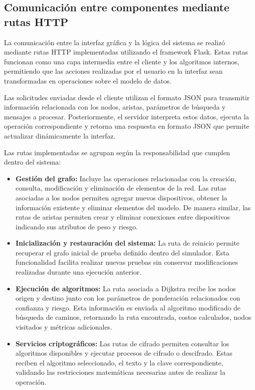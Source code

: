 \documentclass[conference]{IEEEtran}
\begin{document}
\subsection{Comunicación entre componentes mediante rutas HTTP}
La comunicación entre la interfaz gráfica y la lógica del sistema se realizó mediante rutas HTTP implementadas utilizando el framework Flask. Estas rutas funcionan como una capa intermedia entre el cliente y los algoritmos internos, permitiendo que las acciones realizadas por el usuario en la interfaz sean transformadas en operaciones sobre el modelo de datos.

Las solicitudes enviadas desde el cliente utilizan el formato JSON para transmitir información relacionada con los nodos, aristas, parámetros de búsqueda y mensajes a procesar. Posteriormente, el servidor interpreta estos datos, ejecuta la operación correspondiente y retorna una respuesta en formato JSON que permite actualizar dinámicamente la interfaz.

Las rutas implementadas se agrupan según la responsabilidad que cumplen dentro del sistema:

\begin{itemize}

    \item \textbf{Gestión del grafo:}
    Incluye las operaciones relacionadas con la creación, consulta, modificación y eliminación de elementos de la red. Las rutas asociadas a los nodos permiten agregar nuevos dispositivos, obtener la información existente y eliminar elementos del modelo. De manera similar, las rutas de aristas permiten crear y eliminar conexiones entre dispositivos indicando sus atributos de peso y riesgo.

    \item \textbf{Inicialización y restauración del sistema:}
    La ruta de reinicio permite recuperar el grafo inicial de prueba definido dentro del simulador. Esta funcionalidad facilita realizar nuevas pruebas sin conservar modificaciones realizadas durante una ejecución anterior.

    \item \textbf{Ejecución de algoritmos:}
    La ruta asociada a Dijkstra recibe los nodos origen y destino junto con los parámetros de ponderación relacionados con confianza y riesgo. Esta información es enviada al algoritmo modificado de búsqueda de caminos, retornando la ruta encontrada, costos calculados, nodos visitados y métricas adicionales.

    \item \textbf{Servicios criptográficos:}
    Las rutas de cifrado permiten consultar los algoritmos disponibles y ejecutar procesos de cifrado o descifrado. Estas reciben el algoritmo seleccionado, el texto y la clave correspondiente, validando las restricciones matemáticas necesarias antes de realizar la operación.

\end{itemize}
\end{document}
